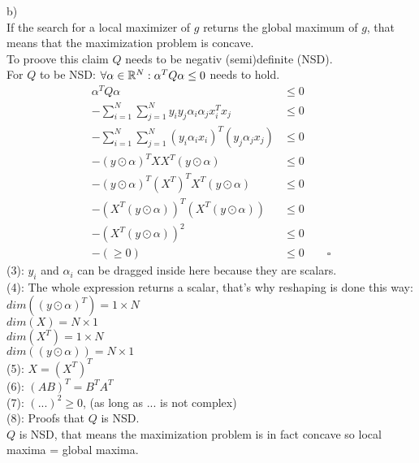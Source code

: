 \begin{flushleft}
b)\\
If the search for a local maximizer of $g$ returns the global maximum of $g$, that
means that the maximization problem is concave.\\
To proove this claim $Q$ needs to be negativ (semi)definite (NSD).\\
For $Q$ to be NSD: $\forall \alpha \in \mathbb{R}^{N}: \alpha^{T}Q\alpha \leq 0$ 
needs to hold.\\
\begin{align}
\alpha^{T}Q\alpha &\leq 0\\
-\sum_{i=1}^{N}\sum_{j=1}^{N}y_{i}y_{j}\alpha_{i}\alpha_{j}x^{T}_{i}x_{j} &\leq 0\\
-\sum_{i=1}^{N}\sum_{j=1}^{N}(y_{i}\alpha_{i}x_{i})^{T}(y_{j}\alpha_{j}x_{j}) &\leq 0\\
-(y\odot\alpha)^{T}XX^{T}(y\odot\alpha) &\leq 0\\
-(y\odot\alpha)^{T}(X^{T})^{T}X^{T}(y\odot\alpha) &\leq 0\\
-(X^{T}(y\odot\alpha))^{T}(X^{T}(y\odot\alpha)) &\leq 0\\
-(X^{T}(y\odot\alpha))^{2} &\leq 0\\
-(\geq 0) &\leq 0 \qquad \square
\end{align}
(3): $y_{i}$ and $\alpha_{i}$ can be dragged inside here because they are scalars.\\
(4): The whole expression returns a scalar, that's why reshaping is done this way:\\
$dim((y\odot\alpha)^{T})= 1 \times N$\\
$dim(X)= N \times 1$\\
$dim(X^{T})= 1 \times N$\\
$dim((y\odot\alpha))= N \times 1$\\
(5): $X=(X^{T})^{T}$\\
(6): $(AB)^{T}=B^{T}A^{T}$\\
(7): $(...)^{2} \geq 0 $, (as long as $...$ is not complex)\\
(8): Proofs that $Q$ is NSD.\\
$Q$ is NSD, that means the maximization problem is in fact concave so local maxima = global maxima.
\end{flushleft}
%
%
%
